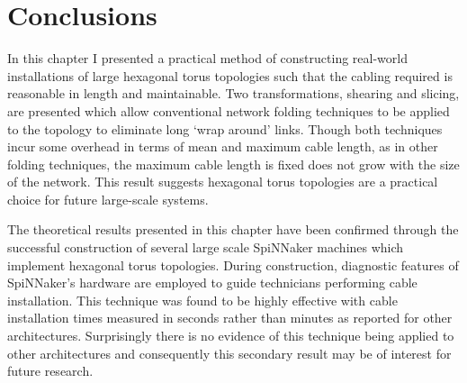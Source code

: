 	\section{Conclusions}
		
		In this chapter I presented a practical method of constructing real-world
		installations of large hexagonal torus topologies such that the cabling
		required is reasonable in length and maintainable. Two transformations,
		shearing and slicing, are presented which allow conventional network
		folding techniques to be applied to the topology to eliminate long `wrap
		around' links. Though both techniques incur some overhead in terms of mean
		and maximum cable length, as in other folding techniques, the maximum cable
		length is fixed does not grow with the size of the network. This result
		suggests hexagonal torus topologies are a practical choice for future
		large-scale systems.
		
		The theoretical results presented in this chapter have been confirmed
		through the successful construction of several large scale SpiNNaker
		machines which implement hexagonal torus topologies. During construction,
		diagnostic features of SpiNNaker's hardware are employed to guide
		technicians performing cable installation. This technique was found to be
		highly effective with cable installation times measured in seconds rather
		than minutes as reported for other architectures. Surprisingly there is no
		evidence of this technique being applied to other architectures and
		consequently this secondary result may be of interest for future research.
